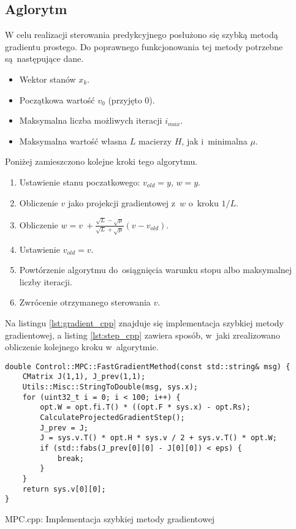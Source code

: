 \subsection{Aglorytm} \label{sec:algorithm}
W celu realizacji sterowania predykcyjnego posłużono się szybką metodą gradientu prostego.
Do poprawnego funkcjonowania tej metody potrzebne są~następujące dane. \cite{gradient}
\begin{itemize}
    \item Wektor stanów $x_k$.
    \item Początkowa wartość $v_0$ (przyjęto 0).
    \item Maksymalna liczba możliwych iteracji $i_{max}$.
    \item Maksymalna wartość własna $L$ macierzy $H$, jak i~minimalna $\mu$. 
\end{itemize}
Poniżej zamieszczono kolejne kroki tego algorytmu.
\begin{enumerate}
    \item Ustawienie stanu poczatkowego: $v_{old} = y$, $w = y$.
    \item Obliczenie $v$ jako projekcji gradientowej z~$w$ o~kroku $1/L$.
    \item Obliczenie $w = v~+ \frac{\sqrt{L} - \sqrt{\mu}}{\sqrt{L} + \sqrt{\mu}}(v - v_{old})$.
    \item Ustawienie $v_{old} = v$.
    \item Powtórzenie algorytmu do~osiągnięcia warunku stopu albo maksymalnej liczby iteracji.
    \item Zwrócenie otrzymanego sterowania $v$.  
\end{enumerate}
Na listingu \ref{lst:gradient_cpp} znajduje się implementacja szybkiej metody gradientowej, a
listing \ref{lst:step_cpp} zawiera sposób, w~jaki zrealizowano obliczenie kolejnego kroku w~algorytmie.
\begin{listing}[htb]
\begin{verbatim}
double Control::MPC::FastGradientMethod(const std::string& msg) {
    CMatrix J(1,1), J_prev(1,1);
    Utils::Misc::StringToDouble(msg, sys.x);
    for (uint32_t i = 0; i < 100; i++) {
        opt.W = opt.fi.T() * ((opt.F * sys.x) - opt.Rs);
        CalculateProjectedGradientStep();
        J_prev = J;
        J = sys.v.T() * opt.H * sys.v / 2 + sys.v.T() * opt.W;
        if (std::fabs(J_prev[0][0] - J[0][0]) < eps) {
            break;
        }
    }
    return sys.v[0][0];
}
\end{verbatim}
\caption{MPC.cpp: Implementacja szybkiej metody gradientowej}
\label{lst:gradient_cpp}
\end{listing}

